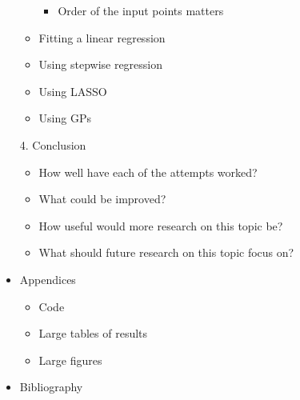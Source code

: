 \begin{itemize}
\begin{itemize}
\begin{itemize}
			            \item Order of the input points matters
		            \end{itemize}
		      \item Fitting a linear regression
		      \item Using stepwise regression
		      \item Using LASSO
		      \item Using GPs
	      \end{itemize}
	\item[4.] Conclusion
	      \begin{itemize}
		      \item How well have each of the attempts worked?
		      \item What could be improved?
		      \item How useful would more research on this topic  be?
		      \item What should future research on this topic focus on?
	      \end{itemize}
	\item Appendices
	      \begin{itemize}
		      \item Code
		      \item Large tables of results
		      \item Large figures
	      \end{itemize}
	\item Bibliography
\end{itemize}
